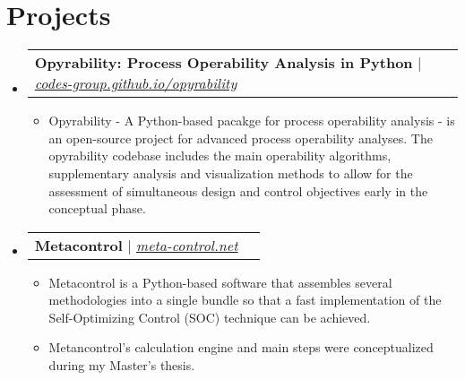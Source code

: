 \documentclass[letterpaper,11pt]{article}
\makeatletter
\newcommand{\resumeItem}[1]{
  \item\small{
    {#1 \vspace{-2pt}}
  }
}
\newcommand{\resumeProjectHeading}[2]{
    \vspace{-2pt}\item
    \begin{tabular*}{0.97\textwidth}{l@{\extracolsep{\fill}}r}
      \small#1 & #2 \\
    \end{tabular*}\vspace{-7pt}
}
\newcommand{\resumeSubHeadingListStart}{\begin{itemize}[leftmargin=0.15in, label={}]}
\newcommand{\resumeSubHeadingListEnd}{\end{itemize}}
\newcommand{\resumeItemListStart}{\begin{itemize}}
\newcommand{\resumeItemListEnd}{\end{itemize}\vspace{-5pt}}
\makeatother
\begin{document}
        



\section{Projects}
    \vspace{3pt}
    \resumeSubHeadingListStart
      
      \resumeProjectHeading
        {\textbf{Opyrability: Process Operability Analysis in Python} $|$ \emph{\href{https://codes-group.github.io/opyrability}{\color{blue}codes-group.github.io/opyrability}}}{}
          \resumeItemListStart
            \resumeItem{Opyrability - A Python-based pacakge for process operability analysis - is an open-source project for advanced process operability analyses. The opyrability codebase includes the main operability algorithms, supplementary analysis and visualization methods to allow for the assessment of simultaneous design and control objectives early in the conceptual phase.}
          \resumeItemListEnd
      
      \resumeProjectHeading
        {\textbf{Metacontrol} $|$ \emph{\href{https://meta-control.net/}{\color{blue}meta-control.net}}}{}
          \resumeItemListStart
            \resumeItem{Metacontrol is a Python-based software that assembles several methodologies into a single bundle so that a fast implementation of the Self-Optimizing Control (SOC) technique can be achieved.}
            \resumeItem{Metancontrol's calculation engine and main steps were conceptualized during my Master's thesis.}
          \resumeItemListEnd
      
    \resumeSubHeadingListEnd


\end{document}
